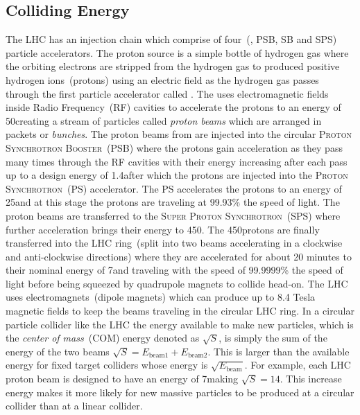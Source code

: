 \subsection{Colliding Energy}
The LHC has an injection chain which comprise of four~(\linac, PSB, SB and SPS) particle accelerators. The proton source is a simple bottle of hydrogen gas where the orbiting electrons are stripped from the hydrogen gas to produced positive hydrogen ions~(protons) using an electric field as the hydrogen gas passes through the first particle accelerator called \linac. The \linac uses electromagnetic fields inside Radio Frequency~(RF) cavities to accelerate the protons to an energy of 50\MeV creating a stream of particles called \textit{proton beams} which are arranged in packets or \textit{bunches}. The proton beams from \linac are injected into the circular \textsc{Proton Synchrotron Booster}~(PSB) where the protons gain acceleration as they pass many times through the RF cavities with their energy increasing after each pass up to a design energy of 1.4\GeV after which the protons are injected into the \textsc{Proton Synchrotron}~(PS) accelerator. The PS accelerates the protons to an energy of 25\GeV and at this stage the protons are traveling at 99.93\% the speed of light. The proton beams are transferred to the \textsc{Super Proton Synchrotron}~(SPS) where further acceleration brings their energy to 450\GeV. The 450\GeV protons are finally transferred into the LHC ring~(split into two beams accelerating in a clockwise and anti-clockwise directions) where they are accelerated for about 20 minutes to their nominal energy of 7\TeV and traveling with the speed of 99.9999\% the speed of light before being squeezed by quadrupole magnets to collide head-on. The LHC uses electromagnets~(dipole magnets) which can produce up to 8.4 Tesla magnetic fields to keep the beams traveling in the circular LHC ring.
\newline
In a circular particle collider like the LHC the energy available to make new particles, which is the \textit{center of mass}~(COM) energy denoted as $\sqrt{S}$, is simply the sum of the energy of the two beams \ie $\sqrt{S} = \mathit{E}_{\mbox{beam1}} + \mathit{E}_{\mbox{beam2}}$. This is larger than the available energy for fixed target colliders whose energy is $\sqrt{\mathit{E}_{\mbox{beam}}}$. For example,  each LHC proton beam is designed to have an energy of 7\TeV  making $\sqrt{S} = 14$\TeV. This increase energy  makes it more likely for new massive particles to be produced at a circular collider than at a linear collider. 

